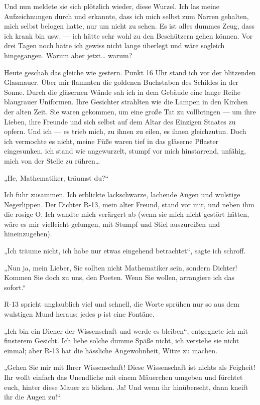 Und nun meldete sie sich plötzlich wieder, diese Wurzel. Ich las
meine Aufzeichnungen durch und erkannte, dass ich mich selbst zum
Narren gehalten, mich selbst belogen hatte, nur um \wurzel{} nicht zu
sehen. Es ist alles dummes Zeug, dass ich krank bin usw. — ich
hätte sehr wohl zu den Beschützern gehen können. Vor drei Tagen
noch hätte ich gewiss nicht lange überlegt und wäre sogleich
hingegangen. Warum aber jetzt\ldots{} warum?

Heute geschah das gleiche
wie gestern. Punkt 16 Uhr stand ich vor der blitzenden Glasmauer.
Über mir flammten die goldenen Buchstaben des Schildes in der
Sonne. Durch die gläsernen Wände sah ich in dem Gebäude eine lange
Reihe blaugrauer Uniformen. Ihre Gesichter strahlten wie die Lampen
in den Kirchen der alten Zeit. Sie waren gekommen, um eine große
Tat zu vollbringen — um ihre Lieben, ihre Freunde und sich selbst
auf dem Altar des Einzigen Staates zu opfern. Und ich — es trieb
mich, zu ihnen zu eilen, es ihnen gleichzutun. Doch ich vermochte
es nicht, meine Füße waren tief in das gläserne Pflaster
eingesunken, ich stand wie angewurzelt, stumpf vor mich
hinstarrend, unfähig, mich von der Stelle zu rühren\ldots{}

 „He, Mathematiker, träumst du?“

Ich fuhr zusammen. Ich erblickte lackschwarze, lachende Augen und
wulstige Negerlippen. Der Dichter R-13, mein alter Freund, stand
vor mir, und neben ihm die rosige O. Ich wandte mich verärgert ab
(wenn sie mich nicht gestört hätten, wäre es mir vielleicht
gelungen, \wurzel{} mit Stumpf und Stiel auszureißen und hineinzugehen).

„Ich träume nicht, ich habe nur etwas eingehend betrachtet“, sagte
ich schroff.

„Nun ja, mein Lieber, Sie sollten nicht Mathematiker sein, sondern
Dichter! Kommen Sie doch zu uns, den Poeten. Wenn Sie wollen,
arrangiere ich das sofort.“

R-13 spricht unglaublich viel und
schnell, die Worte sprühen nur so aus dem wulstigen Mund heraus;
jedes p ist eine Fontäne.

„Ich bin ein Diener der Wissenschaft und werde es bleiben“,
entgegnete ich mit finsterem Gesicht. Ich liebe solche dumme Späße
nicht, ich verstehe sie nicht einmal; aber R-13 hat die hässliche
Angewohnheit, Witze zu machen.

„Gehen Sie mir mit Ihrer Wissenschaft! Diese Wissenschaft ist
nichts als Feigheit! Ihr wollt einfach das Unendliche mit einem
Mäuerchen umgeben und fürchtet euch, hinter diese Mauer zu blicken.
Ja! Und wenn ihr hinüberseht, dann kneift ihr die Augen zu!“

